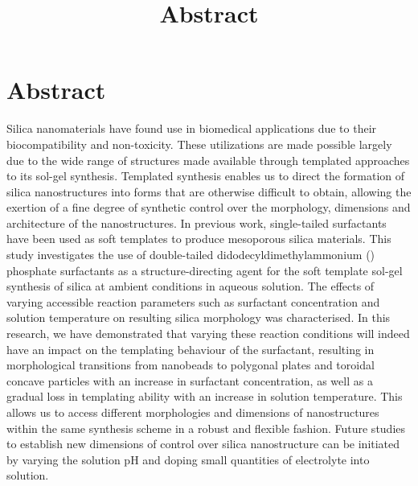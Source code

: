\documentclass[a4paper,12pt]{article}
\date{}
\title{Abstract} %
\begin{document}
	\section*{Abstract}
	
	\vspace{1.5\baselineskip} %
	
	
	 Silica nanomaterials have found use in biomedical applications due to their biocompatibility and non-toxicity. These utilizations are made possible largely due to the wide range of structures made available through templated approaches to its sol-gel synthesis. Templated synthesis enables us to direct the formation of silica nanostructures into forms that are otherwise difficult to obtain, allowing the exertion of a fine degree of synthetic control over the morphology, dimensions and architecture of the nanostructures. In previous work, single-tailed surfactants have been used as soft templates to produce mesoporous silica materials. This study investigates the use of double-tailed didodecyldimethylammonium () phosphate surfactants as a structure-directing agent for the soft template sol-gel synthesis of silica at ambient conditions in aqueous solution. The effects of varying accessible reaction parameters such as surfactant concentration and solution temperature on resulting silica morphology was characterised. In this research, we have demonstrated that varying these reaction conditions will indeed have an impact on the templating behaviour of the surfactant, resulting in morphological transitions from nanobeads to polygonal plates and toroidal concave particles with an increase in surfactant concentration, as well as a gradual loss in templating ability with an increase in solution temperature. This allows us to access different morphologies and dimensions of nanostructures within the same synthesis scheme in a robust and flexible fashion. Future studies to establish new dimensions of control over silica nanostructure can be initiated by varying the solution pH and doping small quantities of electrolyte into solution.
	 
	 
	
\end{document}

